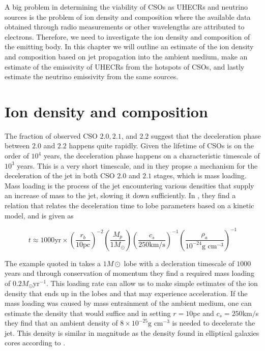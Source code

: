 \label{sec:emissivity_sec}

A big problem in determining the viability of CSOs as UHECRs and neutrino sources is the problem of ion density and composition where the available data obtained through radio measurements or other wavelengths are attributed to electrons. Therefore, we need to investigate the ion density and composition of the emitting body. In this chapter we will outline an estimate of the ion density and composition based on jet propagation into the ambient medium,  make an estimate of the emissivity of UHECRs from the hotspots of CSOs, and lastly estimate the neutrino emissivity from the same sources.


\section{Ion density and composition}
The fraction of observed CSO $2.0,2.1$, and $2.2$ suggest that the deceleration phase between $2.0$ and $2.2$ happens quite rapidly. Given the lifetime of CSOs is on the order of $10^4$ years, the deceleration phase happens on a characteristic timescale of $10^3$ years. This is a very short timescale, and in \cite{sullivan2024smallscale} they propse a mechanism for the deceleration of the jet in both CSO $2.0$ and $2.1$ stages, which is mass loading. Mass loading is the process of the jet encountering various densities that supply an increase of mass to the jet, slowing it down sufficiently. In \cite{sullivan2024smallscale}, they find a relation that relates the deceleration time to lobe parameters based on a kinetic model, and is given as

\begin{equation}
    t \approx 1000\text{yr}\times \left(\frac{r_{b}}{10  \text{pc}}\right)^{-2} \left(\frac{M_p}{1 M_{\odot}}\right) \left(\frac{c_s }{250 \text{km/s}}\right)^{-1} \left(\frac{\rho_a}{10^{-24}\text{g cm}^{-3}}\right)^{-1}
\end{equation}

The example quoted in \cite{sullivan2024smallscale} takes a $1 M\odot$ lobe with a decleration timescale of $1000$ years and through conservation of momentum they find a required mass loading of $0.2 M_{\odot} \text{yr}^{-1}$. This loading rate can allow us to make simple estimates of the ion density that ends up in the lobes and that may experience acceleration. If the mass loading was caused by mass entrainment of the ambient medium, one can estimate the density that would suffice and in \cite{sullivan2024smallscale} setting $r=10$pc and $c_s = 250$km$/$s they find that an ambient density of $8\times 10^{-25} \text{g cm}^{-3}$ is needed to decelerate the jet. This density is similar in magnitude as the density found in elliptical galaxies cores according to \cite{Capelo_2010}. 

